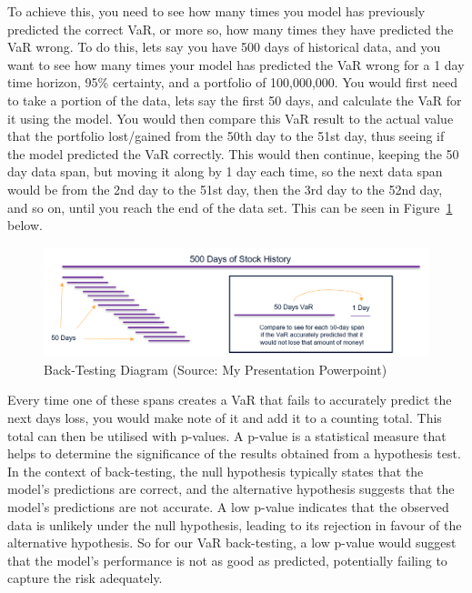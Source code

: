 \documentclass{article}
\begin{document}
To achieve this, you need to see how many times you model has previously predicted the correct VaR, or more so, how many times they have predicted the VaR wrong. To do this, lets say you have 500 days of historical data, and you want to see how many times your model has predicted the VaR wrong for a 1 day time horizon, 95\% certainty, and a portfolio of 100,000,000. 
You would first need to take a portion of the data, lets say the first 50 days, and calculate the VaR for it using the model. You would then compare this VaR result to the actual value that the portfolio lost/gained from the 50th day to the 51st day, thus seeing if the model predicted the VaR correctly. This would then continue, keeping the 50 day data span, but moving it along by 1 day each time, so the next data span would be from the 2nd day to the 51st day, then the 3rd day to the 52nd day, and so on, until you reach the end of the data set. This can be seen in Figure~\ref{fig:Back-Testing} below.\\\vspace{0.3cm}

\begin{figure}[h]
  \centering
  \includegraphics[width=1\textwidth]{Images/Back-Testing.png}
  \caption{Back-Testing Diagram (Source: My Presentation Powerpoint)}
  \label{fig:Back-Testing}
\end{figure}

Every time one of these spans creates a VaR that fails to accurately predict the next days loss, you would make note of it and add it to a counting total. This total can then be utilised with p-values. A p-value is a statistical measure that helps to determine the significance of the results obtained from a hypothesis test. In the context of back-testing, the null hypothesis typically states that the model's predictions are correct, and the alternative hypothesis suggests that the model's predictions are not accurate. A low p-value indicates that the observed data is unlikely under the null hypothesis, leading to its rejection in favour of the alternative hypothesis. So for our VaR back-testing, a low p-value would suggest that the model's performance is not as good as predicted, potentially failing to capture the risk adequately.
\end{document}
